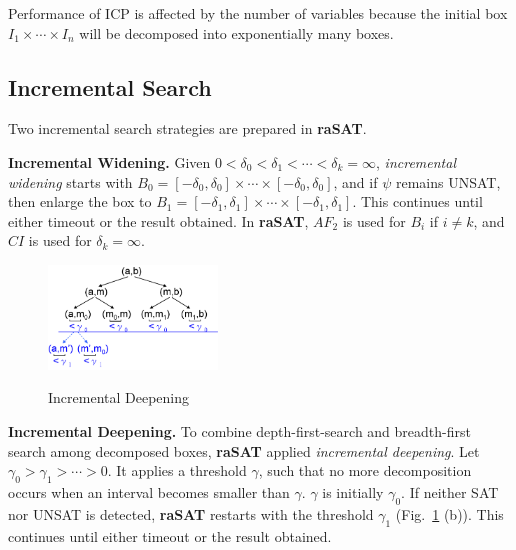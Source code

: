 \documentclass[runningheads,a4paper,oribibl]{llncs}
\begin{document}
Performance of ICP is affected by the number of variables because the initial box 
$I_1 \times \cdots \times I_n$ will be decomposed into exponentially many boxes.

\subsection{Incremental Search} \label{sec:incsearch}

Two incremental search strategies are prepared in {\bf raSAT}. 

\medskip \noindent 
\textbf{Incremental Widening.}
Given $0 < \delta_0 < \delta_1 < \cdots < \delta_k = \infty$, 
{\em incremental widening} starts with 
$B_0 = [-\delta_0 , \delta_0] \times \cdots \times [-\delta_0 , \delta_0]$,
and if $\psi$ remains UNSAT, then enlarge the box to 
$B_1 = [-\delta_1 , \delta_1] \times \cdots \times [-\delta_1 , \delta_1]$.
This continues until either timeout or the result obtained. 
In {\bf raSAT}, $AF_2$ is used for $B_i$ if $i \neq k$, and $CI$ is used
for $\delta_k = \infty$. 

\begin{figure}
\centering
\includegraphics[width=0.4\textwidth]{IncDeepen.png} \\
\caption{Incremental Deepening}
\label{fig:incwid}
\end{figure}

\noindent 
\textbf{Incremental Deepening.}
To combine depth-first-search and breadth-first search among decomposed boxes,
{\bf raSAT} applied {\em incremental deepening}. 
Let $\gamma_0 > \gamma_1 > \cdots > 0$. 
It applies a threshold $\gamma$, such that no more decomposition occurs 
when an interval becomes smaller than $\gamma$.
$\gamma$ is initially $\gamma_0$. 
If neither SAT nor UNSAT is detected, {\bf raSAT} restarts with the threshold $\gamma_1$
(Fig.~\ref{fig:incwid} (b)). 
This continues until either timeout or the result obtained. 
\end{document}

